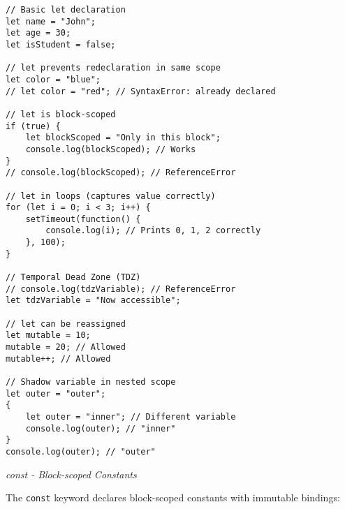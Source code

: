 \documentclass[12pt,a4paper,oneside]{book}
\newcommand{\mysubsubsection}[1]{%
    \vspace{0.1em}
    {\normalsize\itshape #1}
    \vspace{0.1em}
}
\begin{document}
\begin{lstlisting}[style=javascript, caption={\textbf{let Declaration Characteristics}}, label=lst:let-details]
// Basic let declaration
let name = "John";
let age = 30;
let isStudent = false;

// let prevents redeclaration in same scope
let color = "blue";
// let color = "red"; // SyntaxError: already declared

// let is block-scoped
if (true) {
    let blockScoped = "Only in this block";
    console.log(blockScoped); // Works
}
// console.log(blockScoped); // ReferenceError

// let in loops (captures value correctly)
for (let i = 0; i < 3; i++) {
    setTimeout(function() {
        console.log(i); // Prints 0, 1, 2 correctly
    }, 100);
}

// Temporal Dead Zone (TDZ)
// console.log(tdzVariable); // ReferenceError
let tdzVariable = "Now accessible";

// let can be reassigned
let mutable = 10;
mutable = 20; // Allowed
mutable++; // Allowed

// Shadow variable in nested scope
let outer = "outer";
{
    let outer = "inner"; // Different variable
    console.log(outer); // "inner"
}
console.log(outer); // "outer"
\end{lstlisting}

\mysubsubsection{const - Block-scoped Constants}

The \texttt{const} keyword declares block-scoped constants with immutable bindings:
\end{document}
